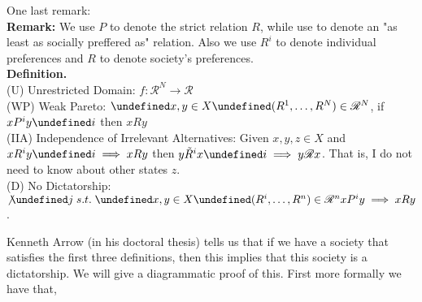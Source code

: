 \documentclass[dvips,11pt]{article}
\let\oldforall\forall
\let\forall\undefined
\DeclareMathOperator{\forall}{\,\oldforall\,}
\let\oldexists\exists
\let\exists\undefined
\DeclareMathOperator{\exists}{\,\oldexists\,}
\DeclareMathOperator{\?}{\,?\,}
\begin{document}
One last remark:
\\\textbf{Remark:} We use $P$ to denote the strict relation $R$, while use to denote an "as least as socially preffered as" relation. Also we use $R^i$ to denote individual preferences and $R$ to denote society's preferences.
\\\textbf{Definition.}
\\ (U) Unrestricted Domain: $f: \mathscr{R}^N \rightarrow \mathscr{R}$
\\ (WP) Weak Pareto: $\forall x,y \in X \forall (R^1,\dots,R^N)\in\mathscr{R}^N$, if $xP^iy \forall i$ then $xRy$
\\ (IIA) Independence of Irrelevant Alternatives: Given $x,y,z \in X$ and $xR^iy \forall i \implies xRy$ then $y\tilde{R}^ix \forall i \implies y\mathscr{R}x$. That is, I do not need to know about other states $z$.
\\ (D) No Dictatorship: $\not\exists j \; s.t. \; \forall x,y \in X \forall (R^i, \dots, R^n) \in \mathscr{R}^n xP^iy \implies xRy$.

Kenneth Arrow (in his doctoral thesis) tells us that if we have a society that satisfies the first three definitions, then this implies that this society is a dictatorship. We will give a diagrammatic proof of this. First more formally we have that,
\end{document}
